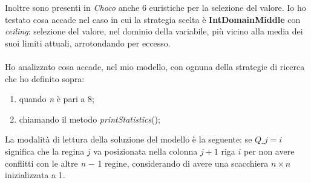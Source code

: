 \noindent
Inoltre sono presenti in \textit{Choco} anche $6$ euristiche per la selezione del valore. Io ho testato cosa accade nel caso in cui la strategia scelta \`e \textbf{IntDomainMiddle} con \textit{ceiling}: selezione del valore, nel dominio della variabile, pi\`u vicino alla media dei suoi limiti attuali, arrotondando per eccesso. 
\\\\
\noindent
Ho analizzato cosa accade, nel mio modello, con ognuna della strategie di ricerca che ho definito sopra:
\begin{enumerate}
\item quando \textit{n} \`e pari a $8$;
\item chiamando il metodo \textit{printStatistics}();
\end{enumerate}
\noindent
La modalit\`a di lettura della soluzione del modello \`e la seguente: se $Q\_ j = i$ significa che la regina $j$ va posizionata nella colonna $j+1$ riga $i$ per non avere conflitti con le altre  \textit{n} $-$ 1 regine, considerando di avere una scacchiera $n \times n$ inizializzata a 1.

